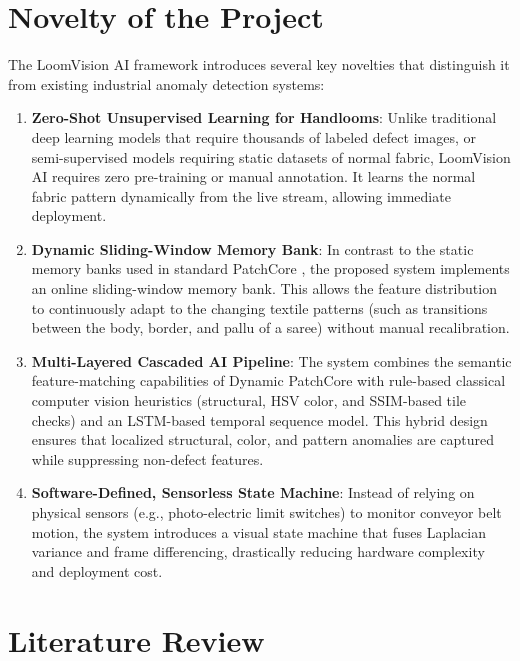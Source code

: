 \documentclass{ieeeaccess}
\begin{document}
\section{Novelty of the Project}

The LoomVision AI framework introduces several key novelties that distinguish it from existing industrial anomaly detection systems:
\begin{enumerate}
    \item \textbf{Zero-Shot Unsupervised Learning for Handlooms}: Unlike traditional deep learning models that require thousands of labeled defect images, or semi-supervised models requiring static datasets of normal fabric, LoomVision AI requires zero pre-training or manual annotation. It learns the normal fabric pattern dynamically from the live stream, allowing immediate deployment.
    \item \textbf{Dynamic Sliding-Window Memory Bank}: In contrast to the static memory banks used in standard PatchCore \cite{b13}, the proposed system implements an online sliding-window memory bank. This allows the feature distribution to continuously adapt to the changing textile patterns (such as transitions between the body, border, and pallu of a saree) without manual recalibration.
    \item \textbf{Multi-Layered Cascaded AI Pipeline}: The system combines the semantic feature-matching capabilities of Dynamic PatchCore with rule-based classical computer vision heuristics (structural, HSV color, and SSIM-based tile checks) and an LSTM-based temporal sequence model. This hybrid design ensures that localized structural, color, and pattern anomalies are captured while suppressing non-defect features.
    \item \textbf{Software-Defined, Sensorless State Machine}: Instead of relying on physical sensors (e.g., photo-electric limit switches) to monitor conveyor belt motion, the system introduces a visual state machine that fuses Laplacian variance and frame differencing, drastically reducing hardware complexity and deployment cost.
\end{enumerate}

\section{Literature Review}
\end{document}
